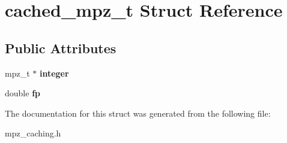 \hypertarget{structcached__mpz__t}{}\section{cached\+\_\+mpz\+\_\+t Struct Reference}
\label{structcached__mpz__t}
\subsection*{Public Attributes}
\begin{DoxyCompactItemize}
\item 
mpz\+\_\+t $\ast$ {\bfseries integer}\hypertarget{structcached__mpz__t_a3a5c6b5acfc037061ef87979bcfd9aa0}{}\label{structcached__mpz__t_a3a5c6b5acfc037061ef87979bcfd9aa0}

\item 
double {\bfseries fp}\hypertarget{structcached__mpz__t_a60b47a7eec98eaa5f98316e5fe1c9724}{}\label{structcached__mpz__t_a60b47a7eec98eaa5f98316e5fe1c9724}

\end{DoxyCompactItemize}


The documentation for this struct was generated from the following file\+:\begin{DoxyCompactItemize}
\item 
mpz\+\_\+caching.\+h\end{DoxyCompactItemize}
